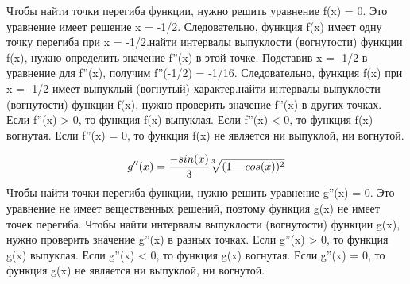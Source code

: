 \documentclass{article}
\begin{document}
\small{Чтобы найти точки перегиба функции, нужно решить уравнение f(x) = 0. Это уравнение имеет решение x = -1/2. Следовательно, функция f(x) имеет одну точку перегиба при x = -1/2.\linebreak{} найти интервалы выпуклости (вогнутости) функции f(x), нужно определить значение f''(x) в этой точке. Подставив x = -1/2 в уравнение для f''(x), получим f''(-1/2) = -1/16. Следовательно, функция f(x) при x = -1/2 имеет выпуклый (вогнутый) характер.\linebreak{} найти интервалы выпуклости (вогнутости) функции f(x), нужно проверить значение f''(x) в других точках. Если f''(x) > 0, то функция f(x) выпуклая. Если f''(x) < 0, то функция f(x) вогнутая. Если f''(x) = 0, то функция f(x) не является ни выпуклой, ни вогнутой.}

\newpage
\large
$$g''(x) = \frac{-sin(x)}{3} \sqrt[\leftroot{3} \uproot{3} 3]{(1 - cos(x))^2}$$
\small{Чтобы найти точки перегиба функции, нужно решить уравнение g''(x) = 0. Это уравнение не имеет вещественных решений, поэтому функция g(x) не имеет точек перегиба.
}
\linebreak
\linebreak
\small{
Чтобы найти интервалы выпуклости (вогнутости) функции g(x), нужно проверить значение g''(x) в разных точках. Если g''(x) > 0, то функция g(x) выпуклая. Если g''(x) < 0, то функция g(x) вогнутая. Если g''(x) = 0, то функция g(x) не является ни выпуклой, ни вогнутой.}

\large
\end{document}
